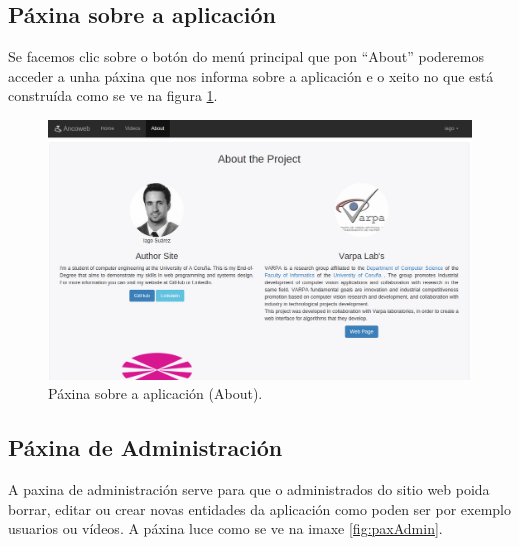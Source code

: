 \documentclass[11pt, a4paper, twoside, titlepage]{book}
\begin{document}
    \subsection{Páxina sobre a aplicación}
        Se facemos clic sobre o botón do menú principal que pon ``About'' poderemos acceder a unha 
        páxina que nos informa sobre a aplicación e o xeito no que está construída como se ve na 
        figura \ref{fig:paxAbout}.
        
        \begin{figure}[htp]
        \begin{center}
            \includegraphics[scale=0.4]{figures/paxAbout.png}
            \caption{Páxina sobre a aplicación (About).}
        \label{fig:paxAbout}
        \end{center}
        \end{figure}
        
    \subsection{Páxina de Administración}
        
        A paxina de administración serve para que o administrados do sitio web poida borrar, editar
        ou crear novas entidades da aplicación como poden ser por exemplo usuarios ou vídeos. A 
        páxina luce como se ve na imaxe \ref{fig:paxAdmin}.
        
\end{document}
